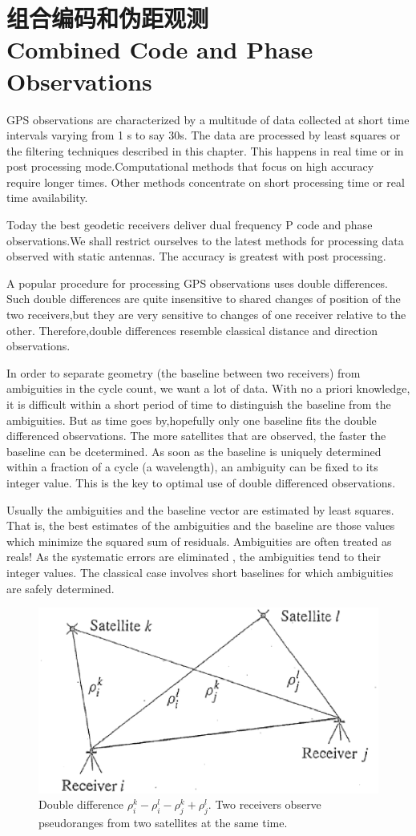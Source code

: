 \section[组合编码和伪距观测]{组合编码和伪距观测\\Combined Code and Phase Observations}
GPS observations are characterized by a multitude of data collected at short time intervals varying from 1 s to say 30s. The data are processed by least squares or the filtering techniques described in this chapter. This happens in real time or in post processing mode.Computational methods that focus on high accuracy require longer times. Other methods concentrate on short processing time or real time availability.

Today the best geodetic receivers deliver dual frequency P code and phase observations.We shall restrict ourselves to the latest methods for processing data observed with static antennas. The accuracy is greatest with post processing.

A popular procedure for processing GPS observations uses double differences. Such double differences are quite insensitive to shared changes of position of the two receivers,but they are very sensitive to changes of one receiver relative to the other. Therefore,double differences resemble classical distance and direction observations.

In order to separate geometry (the baseline between two receivers) from ambiguities in the cycle count, we want a lot of data. With no a priori knowledge, it is difficult within a short period of time to distinguish the baseline from the ambiguities. But as time goes by,hopefully only one baseline fits the double differenced observations. The more satellites that are observed, the faster the baseline can be dcetermined. As soon as the baseline is uniquely determined within a fraction of a cycle (a wavelength), an ambiguity can be fixed to its integer value. This is the key to optimal use of double differenced observations.

Usually the ambiguities and the baseline vector are estimated by least squares. That is, the best estimates of the ambiguities and the baseline are those values which minimize the squared sum of residuals. Ambiguities are often treated as reals! As the systematic errors are eliminated , the ambiguities tend to their integer values. The classical case involves short baselines for which ambiguities are safely determined.

\begin{figure}
	\centering
	\includegraphics[width=0.4\linewidth]{TeX_files/Part03/chapter10/image/9-2}
	\caption{Double difference $\rho_{i}^{k}-\rho_{i}^{l}-\rho_{j}^{k}+\rho_{j}^{l}$. Two receivers observe pseudoranges from two satellites at the same time.}
	\label{fig:9-2}
\end{figure}

